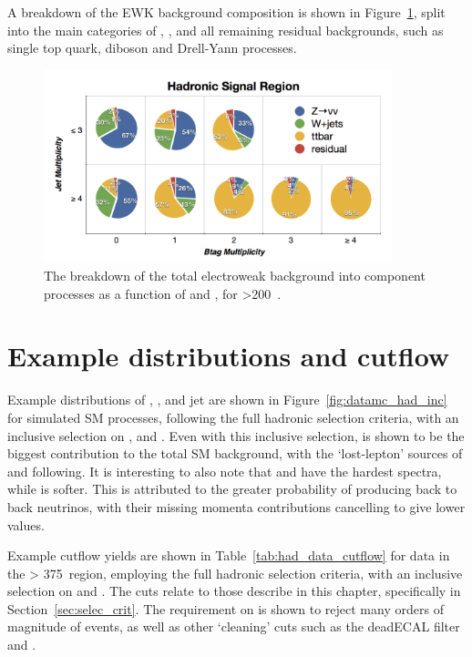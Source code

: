 A breakdown of the EWK background 
composition is shown in Figure~\ref{fig:background_decomp}, split into the main 
categories of \zinv, \wj, \ttbar and all remaining residual backgrounds, such as
single top quark, diboson and Drell-Yann processes.

\begin{figure}[hb!]
\centering
\hspace{0cm}\includegraphics[width=0.9\textwidth, trim=0 00 0 0, clip=true]
{Figs/ra1_had_bg_comp_v3.png}
\caption{The breakdown of the total electroweak background into component
processes as a function of \nj and \nb, for \HT>200~\gev.}
\label{fig:background_decomp}
\end{figure}

\section{Example distributions and cutflow}

Example distributions of \alphat, \HT, \mht and jet \Pt  are
shown in Figure~\ref{fig:datamc_had_inc} for simulated SM processes,
following the full hadronic selection criteria, with an inclusive selection on \HT,
\nj and \nb. Even with this inclusive selection, \zinv is shown to be the biggest
contribution to the total SM background, with the `lost-lepton' sources of \wj and
\ttbar following. It is interesting to also note that \zinv and \wj have the hardest \mht
spectra, while \ttbar is softer. This is attributed to the greater probability of producing
back to back neutrinos, with their missing momenta contributions cancelling to give
lower \mht values.

Example cutflow yields are shown in
Table~\ref{tab:had_data_cutflow} for data in the \HT > 375~\gev region, employing
the full hadronic selection criteria, with an inclusive selection on \nj and \nb.
The cuts relate to those describe in this chapter, specifically in
Section~\ref{sec:selec_crit}. The requirement on \alphat is shown to reject many
orders of magnitude of events, as well as other `cleaning' cuts such as the deadECAL
filter and \mhtmet.

